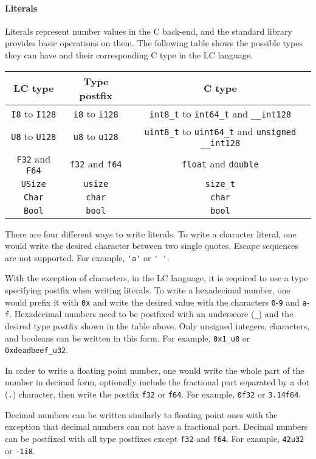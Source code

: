 \documentclass[12pt]{article}
\begin{document}
\paragraph{Literals} Literals represent number values in the C back-end, and the
standard library provides basic operations on them. The following table shows
the possible types they can have and their corresponding C type in the LC
language.
\begin{center}
\begin{tabular}{c c c}
    LC type & Type postfix & C type \\
    \hline
    \verb$I8$ to \verb$I128$ & \verb$i8$ to \verb$i128$ & \verb$int8_t$ to
    \verb$int64_t$ and \verb$__int128$ \\
    \verb$U8$ to \verb$U128$ & \verb$u8$ to \verb$u128$ & \verb$uint8_t$ to
    \verb$uint64_t$ and \verb$unsigned __int128$ \\
    \verb$F32$ and \verb$F64$ & \verb$f32$ and \verb$f64$ & \verb$float$ and
    \verb$double$ \\
    \verb$USize$ & \verb$usize$ & \verb$size_t$ \\
    \verb$Char$ & \verb$char$ & \verb$char$ \\
    \verb$Bool$ & \verb$bool$ & \verb$bool$
\end{tabular}
\end{center}
There are four different ways to write literals. To write a character literal,
one would write the desired character between two single quotes. Escape
sequences are not supported. For example, \verb$'a'$ or \verb$' '$.

With the exception of characters, in the LC language, it is required to use a
type specifying postfix when writing literals. To write a hexadecimal number,
one would prefix it with \verb$0x$ and write the desired value with the
characters \verb$0$-\verb$9$ and \verb$a$-\verb$f$. Hexadecimal numbers need to
be postfixed with an underscore (\verb$_$) and the desired type postfix shown in
the table above. Only unsigned integers, characters, and booleans can be written
in this form. For example, \verb$0x1_u8$ or \verb$0xdeadbeef_u32$.

In order to write a floating point number, one would write the whole part of the
number in decimal form, optionally include the fractional part separated by a
dot (\verb$.$) character, then write the postfix \verb$f32$ or \verb$f64$. For
example, \verb$0f32$ or \verb$3.14f64$.

Decimal numbers can be written similarly to floating point ones with the
exception that decimal numbers can not have a fractional part. Decimal numbers
can be postfixed with all type postfixes except \verb$f32$ and \verb$f64$. For
example, \verb$42u32$ or \verb$-1i8$.
\end{document}
